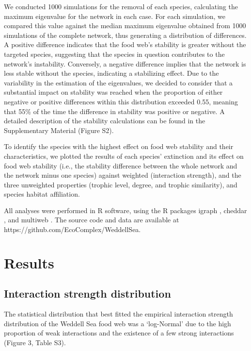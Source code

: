 \documentclass[gc, manuscript]{copernicus}
\begin{document}
We conducted 1000 simulations for the removal of each species,
calculating the maximum eigenvalue for the network in each case. For
each simulation, we compared this value against the median maximum
eigenvalue obtained from 1000 simulations of the complete network, thus
generating a distribution of differences. A positive difference
indicates that the food web's stability is greater without the targeted
species, suggesting that the species in question contributes to the
network's instability. Conversely, a negative difference implies that
the network is less stable without the species, indicating a stabilizing
effect. Due to the variability in the estimation of the eigenvalues, we
decided to consider that a substantial impact on stability was reached
when the proportion of either negative or positive differences within
this distribution exceeded 0.55, meaning that 55\% of the time the
difference in stability was positive or negative. A detailed description
of the stability calculations can be found in the Supplementary Material
(Figure S2).

To identify the species with the highest effect on food web stability
and their characteristics, we plotted the results of each species'
extinction and its effect on food web stability (i.e., the stability
difference between the whole network and the network minus one species)
against weighted (interaction strength), and the three unweighted
properties (trophic level, degree, and trophic similarity), and species
habitat affiliation.

All analyses were performed in R software, using the R packages igraph
\citep{Csardi2005}, cheddar \citep{Hudson2013}, and multiweb
\citep{Saravia2019}. The source code and data are available at
https://github.com/EcoComplex/WeddellSea.

\section{Results}

\subsection{Interaction strength distribution}

The statistical distribution that best fitted the empirical interaction
strength distribution of the Weddell Sea food web was a `log-Normal' due
to the high proportion of weak interactions and the existence of a few
strong interactions (Figure 3, Table S3).
\end{document}
